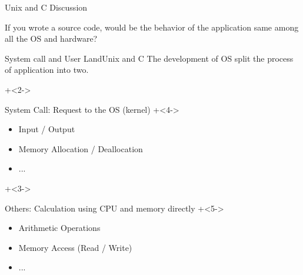 \begin{frame}{Unix and C}{}
    Discussion
    \vspace{4ex}

    If you wrote a source code, would be the behavior of the application same among all the OS and hardware?
\end{frame}


\begin{frame}{System call and User Land}{Unix and C}
    The development of OS split the process of application into two.
    \vspace{2ex}

    \onslide+<2->{{\small
        System Call: Request to the OS (kernel)
        \onslide+<4->{{\footnotesize
            \begin{itemize}
                \item   Input / Output
                \item   Memory Allocation / Deallocation
                \item   ...
            \end{itemize}
        }}
    }}

    \onslide+<3->{{\small
        Others: Calculation using CPU and memory directly
        \onslide+<5->{{\footnotesize
            \begin{itemize}
                \item   Arithmetic Operations
                \item   Memory Access (Read / Write)
                \item   ...
            \end{itemize}
        }}
    }}
\end{frame}
